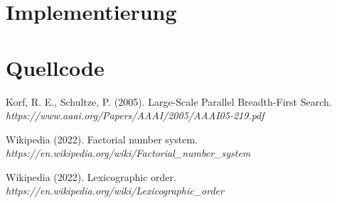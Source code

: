 \documentclass[a4paper, 10pt, ngerman]{article}
\begin{document}
\section{Implementierung}

\section{Quellcode}

\begin{thebibliography}{3}
    Korf, R. E., Schultze, P. (2005).
    Large-Scale Parallel Breadth-First Search. \\
    \emph{https://www.aaai.org/Papers/AAAI/2005/AAAI05-219.pdf}

    Wikipedia (2022).
    Factorial number system. \\
    \emph{https://en.wikipedia.org/wiki/Factorial\_number\_system}

    Wikipedia (2022).
    Lexicographic order. \\
    \emph{https://en.wikipedia.org/wiki/Lexicographic\_order}
\end{thebibliography}
\end{document}
